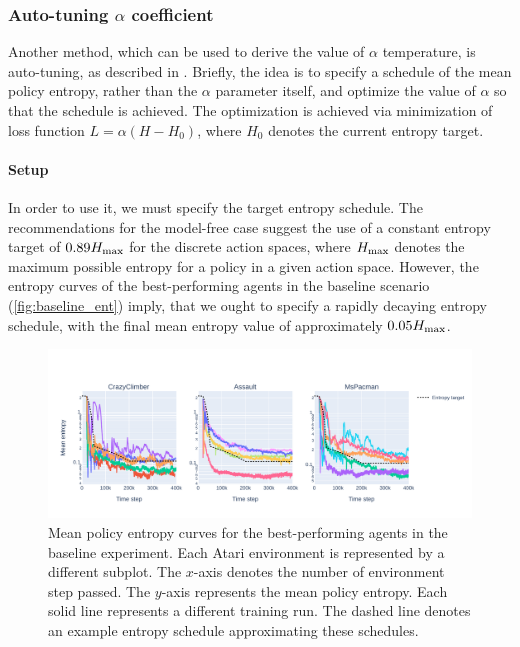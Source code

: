 \documentclass[en]{pracamgr}
\newcommand{\figurewidth}{\linewidth}
\newcommand{\figureheight}{0.8\paperheight}
\begin{document}
\subsubsection{Auto-tuning $\alpha$ coefficient}

Another method, which can be used to derive the value of $\alpha$ temperature, is auto-tuning, as described in \autocite{haarnojaSoftActorCriticAlgorithms2019}. Briefly, the idea is to specify a schedule of the mean policy entropy, rather than the $\alpha$ parameter itself, and optimize the value of $\alpha$ so that the schedule is achieved. The optimization is achieved via minimization of loss function $L = \alpha (H - H_0)$, where $H_0$ denotes the current entropy target.

\paragraph{Setup} In order to use it, we must specify the target entropy schedule. The recommendations for the model-free case suggest the use of a constant entropy target of $0.89 H_{\rm max}$ for the discrete action spaces, where $H_{\rm max}$ denotes the maximum possible entropy for a policy in a given action space. However, the entropy curves of the best-performing agents in the baseline scenario (\autoref{fig:baseline_ent}) imply, that we ought to specify a rapidly decaying entropy schedule, with the final mean entropy value of approximately $0.05 H_{\rm max}$.

\begin{figure}
  \centering
  \includegraphics[width=\figurewidth,height=\figureheight,keepaspectratio]{assets/baseline_ent.pdf}
  \caption{Mean policy entropy curves for the best-performing agents in the baseline experiment. Each Atari environment is represented by a different subplot. The $x$-axis denotes the number of environment step passed. The $y$-axis represents the mean policy entropy. Each solid line represents a different training run. The dashed line denotes an example entropy schedule approximating these schedules.}
  \label{fig:baseline_ent}
\end{figure}
\end{document}
